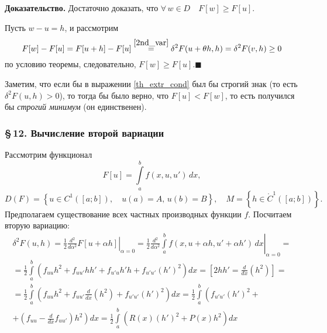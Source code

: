 \documentclass[12pt,a5paper]{book}
\begin{document}
	\vspace*{0.5em}
	\noindent \textbf{Доказательство.} Достаточно доказать, что $\forall\,w \in D \quad F[w] \geq F[u]$.
	
	Пусть $w - u = h$, и рассмотрим
	\begin{equation*}
	F[w] - F[u] = F[u + h] - F[u] \stackrel{\eqref{2nd_var}}{=} \delta^2F(u + \theta h,h) = \delta^2F(v,h) \geq 0
	\end{equation*}
	по условию теоремы, следовательно, $F[w] \geq F[u]$.$\blacksquare$
	
	Заметим, что если бы в выражении \eqref{th_extr_cond} был бы строгий знак (то есть $\delta^2F(u,h) > 0$), то тогда бы было верно, что $F[u] < F[w]$, то есть получился бы \emph{строгий минимум} (он единственен).
	
	\subsubsection*{\S\,12. Вычисление второй вариации}
	
	Рассмотрим функционал
	\begin{equation}\label{Legendre}
		F[u] = \int\limits_a^b f(x, u, u')\,dx,
	\end{equation}
	\begin{equation*}
		D(F) = \left\{u \in C^1([a;b]), \quad u(a) = A,\, u(b) = B\right\}, \quad M = \left\{h \in \mathring{C}^1([a;b])\right\}.
	\end{equation*}
	Предполагаем существование всех частных производных функции $f$. Посчитаем вторую вариацию:
	\begin{equation*}
		\begin{split}
			\delta^2F(u,h) = \left.\frac{1}{2}\frac{d^2}{d\alpha^2}F[u + \alpha h]\right|_{\alpha=0} = \left.\frac{1}{2}\frac{d^2}{d\alpha^2}\int\limits_a^b f(x, u + \alpha h, u' + \alpha h')\,dx\right|_{\alpha=0} = \\ = \frac{1}{2}\int\limits_a^b \left(f_{uu}h^2 + f_{uu'}hh' + f_{u'u}h'h + f_{u'u'}\left(h'\right)^2\right)dx = \left[2hh' = \frac{d}{dx}\left(h^2\right)\right] = \\ = \frac{1}{2}\int\limits_a^b \left(f_{uu}h^2 + f_{uu'}\frac{d}{dx}\left(h^2\right) + f_{u'u'}\left(h'\right)^2\right)dx = \frac{1}{2}\int\limits_a^b \left(f_{u'u'}\left(h'\right)^2 +\right. \\ \left. + \left( f_{uu} - \frac{d}{dx}f_{uu'} \right)h^2\right)dx = \frac{1}{2}\int\limits_a^b \left(R(x)\left(h'\right)^2 + P(x)h^2\right)dx
		\end{split}
	\end{equation*}
	
\end{document}
